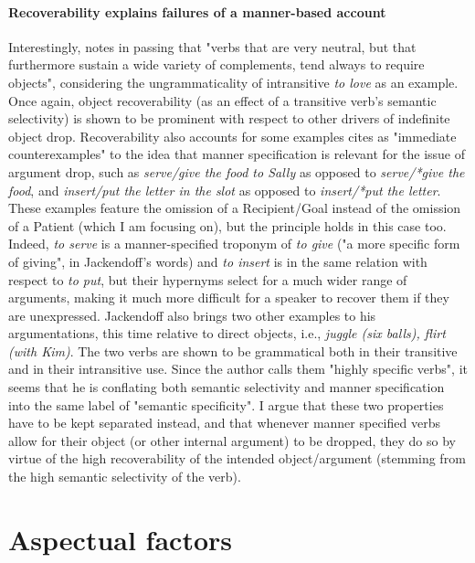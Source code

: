 \paragraph{Recoverability explains failures of a manner-based account}
Interestingly, \textcite[207]{Rice1988} notes in passing that "verbs that are very neutral, but that furthermore sustain a wide variety of complements, tend always to require objects", considering the ungrammaticality of intransitive \textit{to love} as an example. Once again, object recoverability (as an effect of a transitive verb's semantic selectivity) is shown to be prominent with respect to other drivers of indefinite object drop. Recoverability also accounts for some examples \textcite[134]{Jackendoff2003} cites as "immediate counterexamples" to the idea that manner specification is relevant for the issue of argument drop, such as \textit{serve/give the food to Sally} as opposed to \textit{serve/*give the food}, and \textit{insert/put the letter in the slot} as opposed to \textit{insert/*put the letter}. These examples feature the omission of a Recipient/Goal instead of the omission of a Patient (which I am focusing on), but the principle holds in this case too. Indeed, \textit{to serve} is a manner-specified troponym of \textit{to give} ("a more specific form of giving", in Jackendoff's words) and \textit{to insert} is in the same relation with respect to \textit{to put}, but their hypernyms select for a much wider range of arguments, making it much more difficult for a speaker to recover them if they are unexpressed. Jackendoff also brings two other examples to his argumentations, this time relative to direct objects, i.e., \textit{juggle (six balls), ﬂirt (with Kim)}. The two verbs are shown to be grammatical both in their transitive and in their intransitive use. Since the author calls them "highly specific verbs", it seems that he is conflating both semantic selectivity and manner specification into the same label of "semantic specificity". I argue that these two properties have to be kept separated instead, and that whenever manner specified verbs allow for their object (or other internal argument) to be dropped, they do so by virtue of the high recoverability of the intended object/argument (stemming from the high semantic selectivity of the verb).


\section{Aspectual factors} 

